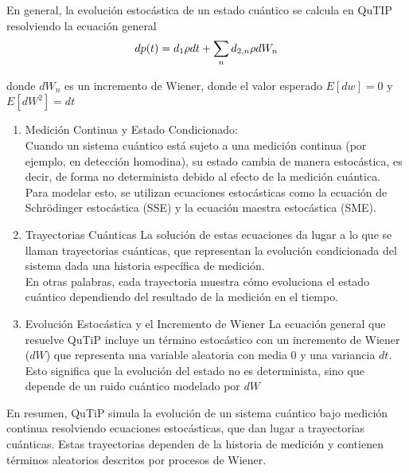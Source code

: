 \documentclass[12pt]{report}
\begin{document}
En general, la evolución estocástica de un estado cuántico se calcula en QuTIP resolviendo la ecuación general \\
\begin{equation}
   dp(t) = d_1 \rho dt + \sum_n d_{2,n} \rho d W_n\\ 
\end{equation}

donde $ d W_n$ es un incremento de Wiener, donde el valor esperado $E[dw] =0$ y $E[dW^2] = dt$\\
\begin{enumerate}


    \item Medición Continua y Estado Condicionado: \\
    Cuando un sistema cuántico está sujeto a una medición continua (por ejemplo, en detección homodina), su estado cambia de manera estocástica, es decir, de forma no determinista debido al efecto de la medición cuántica.\\
    Para modelar esto, se utilizan ecuaciones estocásticas como la ecuación de Schrödinger estocástica (SSE) y la ecuación maestra estocástica (SME).

    \item Trayectorias Cuánticas
    La solución de estas ecuaciones da lugar a lo que se llaman trayectorias cuánticas, que representan la evolución condicionada del sistema dada una historia específica de medición.\\
    En otras palabras, cada trayectoria muestra cómo evoluciona el estado cuántico dependiendo del resultado de la medición en el tiempo.\\

    \item Evolución Estocástica y el Incremento de Wiener
    La ecuación general que resuelve QuTiP incluye un término estocástico con un incremento de Wiener ($dW$) que representa una variable aleatoria con media 0 y una variancia $dt$. \\
    Esto significa que la evolución del estado no es determinista, sino que depende de un ruido cuántico modelado por $dW$
    


\end{enumerate}

En resumen, QuTiP simula la evolución de un sistema cuántico bajo medición continua resolviendo ecuaciones estocásticas, que dan lugar a trayectorias cuánticas. Estas trayectorias dependen de la historia de medición y contienen términos aleatorios descritos por procesos de Wiener.
\end{document}
